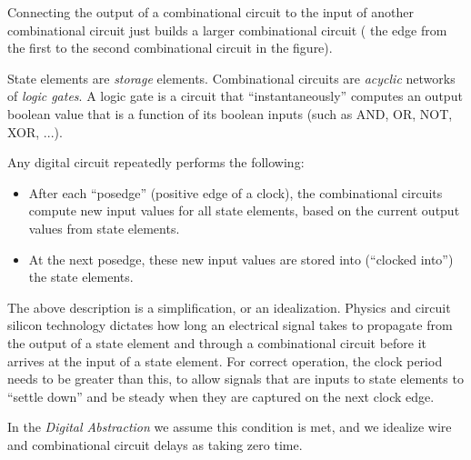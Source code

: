 Connecting the output of a combinational circuit to the input of
another combinational circuit just builds a larger combinational
circuit ({\eg} the edge from the first to the second combinational
circuit in the figure).


State elements are \emph{storage} elements.  Combinational circuits
are \emph{acyclic} networks of \emph{logic gates}.  A logic gate is a
circuit that ``instantaneously'' computes an output boolean value that
is a function of its boolean inputs (such as AND, OR, NOT, XOR, ...).

Any digital circuit repeatedly performs the following:

\begin{itemize}

\item After each ``posedge'' (positive edge of a clock), the
      combinational circuits compute new input values for all state
      elements, based on the current output values from state elements.

\item At the next posedge, these new input values are stored into
      (``clocked into'') the state elements.

\end{itemize}

The above description is a simplification, or an idealization.
Physics and circuit silicon technology dictates how long an electrical
signal takes to propagate from the output of a state element and
through a combinational circuit before it arrives at the input of a
state element.  For correct operation, the clock period needs to be
greater than this, to allow signals that are inputs to state elements
to ``settle down'' and be steady when they are captured on the next
clock edge.


In the \emph{Digital Abstraction} we assume this condition is met, and
we idealize wire and combinational circuit delays as taking zero time.


\vspace{1ex}

